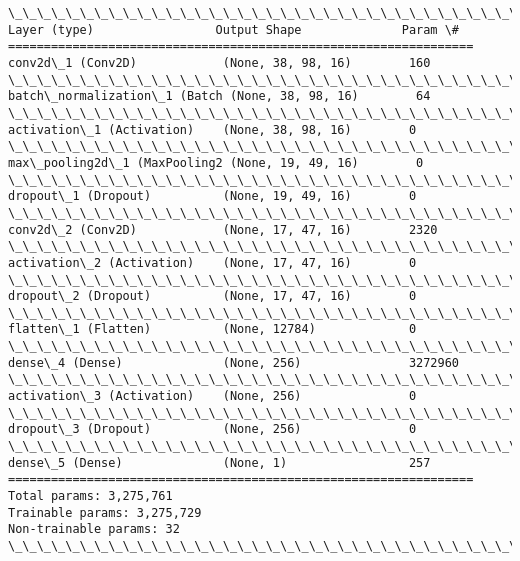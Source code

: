 \documentclass[11pt]{article}
\begin{document}
    \begin{Verbatim}[commandchars=\\\{\}]
\_\_\_\_\_\_\_\_\_\_\_\_\_\_\_\_\_\_\_\_\_\_\_\_\_\_\_\_\_\_\_\_\_\_\_\_\_\_\_\_\_\_\_\_\_\_\_\_\_\_\_\_\_\_\_\_\_\_\_\_\_\_\_\_\_
Layer (type)                 Output Shape              Param \#   
=================================================================
conv2d\_1 (Conv2D)            (None, 38, 98, 16)        160       
\_\_\_\_\_\_\_\_\_\_\_\_\_\_\_\_\_\_\_\_\_\_\_\_\_\_\_\_\_\_\_\_\_\_\_\_\_\_\_\_\_\_\_\_\_\_\_\_\_\_\_\_\_\_\_\_\_\_\_\_\_\_\_\_\_
batch\_normalization\_1 (Batch (None, 38, 98, 16)        64        
\_\_\_\_\_\_\_\_\_\_\_\_\_\_\_\_\_\_\_\_\_\_\_\_\_\_\_\_\_\_\_\_\_\_\_\_\_\_\_\_\_\_\_\_\_\_\_\_\_\_\_\_\_\_\_\_\_\_\_\_\_\_\_\_\_
activation\_1 (Activation)    (None, 38, 98, 16)        0         
\_\_\_\_\_\_\_\_\_\_\_\_\_\_\_\_\_\_\_\_\_\_\_\_\_\_\_\_\_\_\_\_\_\_\_\_\_\_\_\_\_\_\_\_\_\_\_\_\_\_\_\_\_\_\_\_\_\_\_\_\_\_\_\_\_
max\_pooling2d\_1 (MaxPooling2 (None, 19, 49, 16)        0         
\_\_\_\_\_\_\_\_\_\_\_\_\_\_\_\_\_\_\_\_\_\_\_\_\_\_\_\_\_\_\_\_\_\_\_\_\_\_\_\_\_\_\_\_\_\_\_\_\_\_\_\_\_\_\_\_\_\_\_\_\_\_\_\_\_
dropout\_1 (Dropout)          (None, 19, 49, 16)        0         
\_\_\_\_\_\_\_\_\_\_\_\_\_\_\_\_\_\_\_\_\_\_\_\_\_\_\_\_\_\_\_\_\_\_\_\_\_\_\_\_\_\_\_\_\_\_\_\_\_\_\_\_\_\_\_\_\_\_\_\_\_\_\_\_\_
conv2d\_2 (Conv2D)            (None, 17, 47, 16)        2320      
\_\_\_\_\_\_\_\_\_\_\_\_\_\_\_\_\_\_\_\_\_\_\_\_\_\_\_\_\_\_\_\_\_\_\_\_\_\_\_\_\_\_\_\_\_\_\_\_\_\_\_\_\_\_\_\_\_\_\_\_\_\_\_\_\_
activation\_2 (Activation)    (None, 17, 47, 16)        0         
\_\_\_\_\_\_\_\_\_\_\_\_\_\_\_\_\_\_\_\_\_\_\_\_\_\_\_\_\_\_\_\_\_\_\_\_\_\_\_\_\_\_\_\_\_\_\_\_\_\_\_\_\_\_\_\_\_\_\_\_\_\_\_\_\_
dropout\_2 (Dropout)          (None, 17, 47, 16)        0         
\_\_\_\_\_\_\_\_\_\_\_\_\_\_\_\_\_\_\_\_\_\_\_\_\_\_\_\_\_\_\_\_\_\_\_\_\_\_\_\_\_\_\_\_\_\_\_\_\_\_\_\_\_\_\_\_\_\_\_\_\_\_\_\_\_
flatten\_1 (Flatten)          (None, 12784)             0         
\_\_\_\_\_\_\_\_\_\_\_\_\_\_\_\_\_\_\_\_\_\_\_\_\_\_\_\_\_\_\_\_\_\_\_\_\_\_\_\_\_\_\_\_\_\_\_\_\_\_\_\_\_\_\_\_\_\_\_\_\_\_\_\_\_
dense\_4 (Dense)              (None, 256)               3272960   
\_\_\_\_\_\_\_\_\_\_\_\_\_\_\_\_\_\_\_\_\_\_\_\_\_\_\_\_\_\_\_\_\_\_\_\_\_\_\_\_\_\_\_\_\_\_\_\_\_\_\_\_\_\_\_\_\_\_\_\_\_\_\_\_\_
activation\_3 (Activation)    (None, 256)               0         
\_\_\_\_\_\_\_\_\_\_\_\_\_\_\_\_\_\_\_\_\_\_\_\_\_\_\_\_\_\_\_\_\_\_\_\_\_\_\_\_\_\_\_\_\_\_\_\_\_\_\_\_\_\_\_\_\_\_\_\_\_\_\_\_\_
dropout\_3 (Dropout)          (None, 256)               0         
\_\_\_\_\_\_\_\_\_\_\_\_\_\_\_\_\_\_\_\_\_\_\_\_\_\_\_\_\_\_\_\_\_\_\_\_\_\_\_\_\_\_\_\_\_\_\_\_\_\_\_\_\_\_\_\_\_\_\_\_\_\_\_\_\_
dense\_5 (Dense)              (None, 1)                 257       
=================================================================
Total params: 3,275,761
Trainable params: 3,275,729
Non-trainable params: 32
\_\_\_\_\_\_\_\_\_\_\_\_\_\_\_\_\_\_\_\_\_\_\_\_\_\_\_\_\_\_\_\_\_\_\_\_\_\_\_\_\_\_\_\_\_\_\_\_\_\_\_\_\_\_\_\_\_\_\_\_\_\_\_\_\_

    \end{Verbatim}
\end{document}
